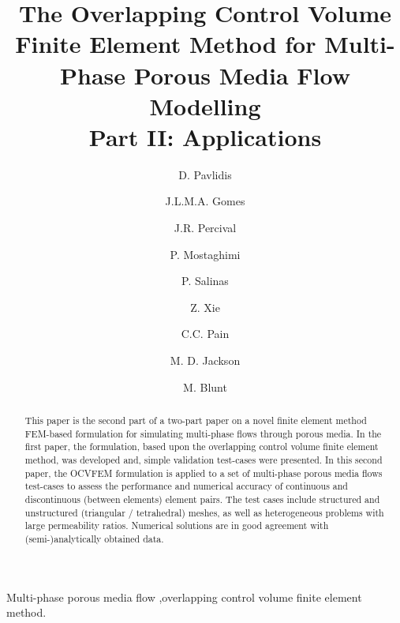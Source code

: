 \documentclass[preprint,authoryear,12pt]{elsarticle}
\begin{document}
\begin{frontmatter}



\title{The Overlapping Control Volume Finite Element Method for Multi-Phase Porous Media Flow Modelling \\
Part II: Applications}

\author[IC]{D. Pavlidis} \author[UoA]{J.L.M.A. Gomes}  \author[IC]{J.R. Percival} \author[IC]{P. Mostaghimi} \author[IC]{P. Salinas} \author[IC]{Z. Xie} \author[IC]{C.C. Pain} \author[IC]{M. D. Jackson}
\author[IC]{M. Blunt} 

\address[IC]{Applied Modelling and Computation Group, Department of Earth Science and Engineering, Imperial College London, UK}
\address[UoA]{Environmental $\&$ Industrial Fluids Mechanics Group, School of Engineering, University of Aberdeen, UK}

\begin{abstract} 
This paper is the second part of a two-part paper on a novel finite
element method FEM-based formulation for simulating multi-phase flows
through porous media. In the first paper, the formulation, based upon
the overlapping control volume finite element method, was developed
and, simple validation test-cases were presented. In this second
paper, the OCVFEM formulation is applied to a set of multi-phase
porous media flows test-cases to assess the performance and numerical
accuracy of continuous and discontinuous (between elements) element
pairs.  The test cases include structured and unstructured (triangular
/ tetrahedral) meshes, as well as heterogeneous problems with large
permeability ratios. Numerical solutions are in good agreement with
(semi-)analytically obtained data.
\end{abstract}

\begin{keyword}
Multi-phase porous media flow \sep overlapping control volume finite element method. 
\end{keyword}

\end{frontmatter}
\end{document}
